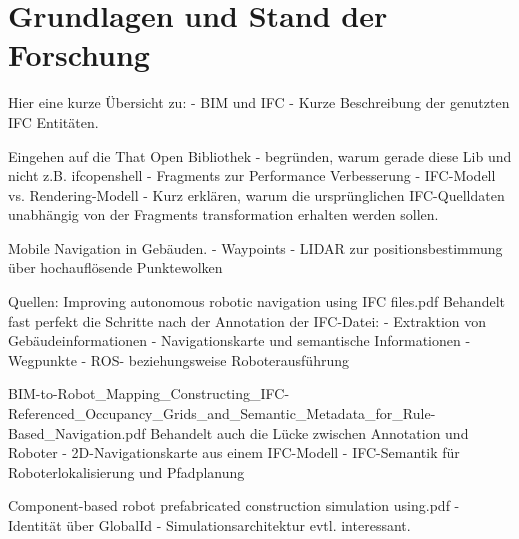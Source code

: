 \section{Grundlagen und Stand der Forschung}\label{sec:Grundlagen}
Hier eine kurze Übersicht zu:
- BIM und IFC \newline
- Kurze Beschreibung der genutzten IFC Entitäten. \newline

Eingehen auf die That Open Bibliothek \newline
- begründen, warum gerade diese Lib und nicht z.B. ifcopenshell \newline
- Fragments zur Performance Verbesserung \newline
- IFC-Modell vs. Rendering-Modell \newline
- Kurz erklären, warum die ursprünglichen IFC-Quelldaten unabhängig von der Fragments transformation erhalten werden sollen. \newline


Mobile Navigation in Gebäuden. \newline
- Waypoints \newline
- LIDAR zur positionsbestimmung über hochauflösende Punktewolken \newline

Quellen: \newline
Improving autonomous robotic navigation using IFC files.pdf \newline
Behandelt fast perfekt die Schritte nach der Annotation der IFC-Datei: \newline
- Extraktion von Gebäudeinformationen \newline
- Navigationskarte und semantische Informationen \newline
- Wegpunkte \newline
- ROS- beziehungsweise Roboterausführung \newline


BIM-to-Robot\_Mapping\_Constructing\_IFC-Referenced\_Occupancy\_Grids\_and\_Semantic\_Metadata\_for\_Rule-Based\_Navigation.pdf \newline
Behandelt auch die Lücke zwischen Annotation und Roboter \newline
- 2D-Navigationskarte aus einem IFC-Modell \newline
- IFC-Semantik für Roboterlokalisierung und Pfadplanung \newline

Component-based robot prefabricated construction simulation using.pdf \newline
- Identität über GlobalId \newline
- Simulationsarchitektur evtl. interessant. \newline

